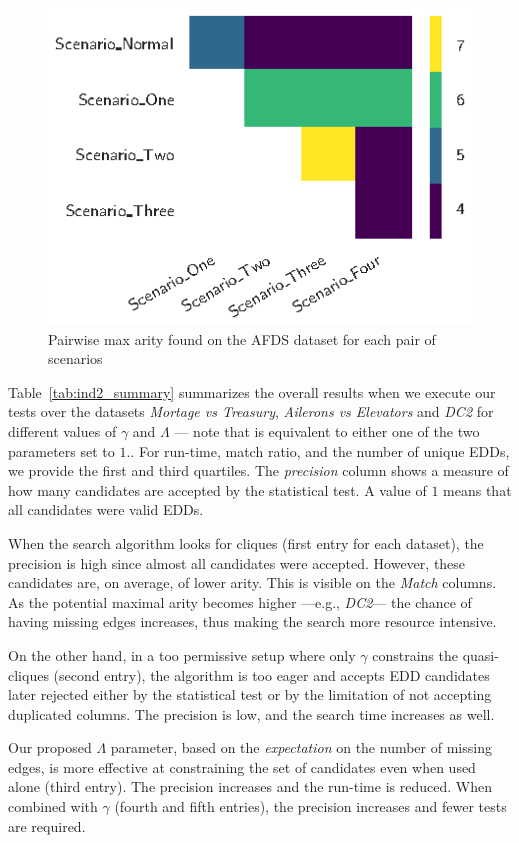 \begin{figure}[ht]
    \centering
    \includegraphics[width=0.5\linewidth]{images/5_presq/afds}
    \caption{
        Pairwise max arity found on the AFDS dataset for each pair of scenarios
    }
    \label{fig:afds}
\end{figure}

Table~\ref{tab:ind2_summary} summarizes the overall results when
we execute our tests over the datasets \emph{Mortage vs Treasury},
\emph{Ailerons vs Elevators} and \emph{DC2} for different values of $\gamma$ and $\Lambda$ ---
note that \Find is equivalent to either one of the two parameters set to $1.$. For run-time,
match ratio, and the number of unique \glspl{EDD}, we provide the first and third quartiles.
The \emph{precision} column shows a measure of how many candidates are accepted by the
statistical test. A value of $1$ means that all candidates were valid \glspl{EDD}.

When the search algorithm looks for cliques (first entry for each dataset),
the precision is high since almost all candidates were accepted. However,
these candidates are, on average, of lower arity. This is visible on the \emph{Match}
columns. As the potential maximal arity becomes higher ---e.g., \emph{DC2}--- the
chance of having missing edges increases, thus making the search more resource intensive.

On the other hand, in a too permissive setup where only $\gamma$ constrains the quasi-cliques
(second entry), the algorithm is too eager and accepts \gls{EDD} candidates later rejected either
by the statistical test or by the limitation of not accepting duplicated columns.
The precision is low, and the search time increases as well.

Our proposed $\Lambda$ parameter, based on the \emph{expectation} on the number of missing edges,
is more effective at constraining the set of candidates even when used alone (third entry).
The precision increases and the run-time is reduced.
When combined with $\gamma$ (fourth and fifth entries), the precision increases and fewer
tests are required.

